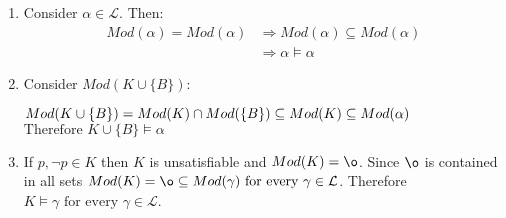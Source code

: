 \begin{enumerate}
    \item Consider $\alpha \in \mathcal{L}$. Then:\\
    \begin{align*}
        Mod(\alpha) = Mod(\alpha) &\Rightarrow Mod(\alpha) \subseteq Mod(\alpha)\\
        &\Rightarrow \alpha \models \alpha
    \end{align*}

    \item Consider $Mod(K \cup \{B\})$:
    
        $Mod(K \cup \{B\}) = Mod(K) \cap Mod(\{B\}) \subseteq Mod(K) \subseteq Mod(\alpha)\\$
        $\text{Therefore } K \cup \{B\} \models \alpha$
    
    \item If $p, \neg p \in K$ then $K$ is unsatisfiable and $Mod(K) = \o$. Since $\o$ is contained in all sets $Mod(K) = \o \subseteq Mod(\gamma) \text{ for every } \gamma \in \mathcal{L}$. Therefore $K \models \gamma \text{ for every } \gamma \in \mathcal{L}$.
\end{enumerate}
